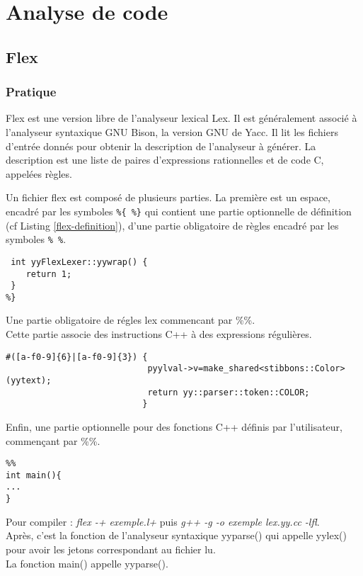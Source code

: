 \section{Analyse de code}

\subsection{Flex}

\subsubsection{Pratique}
Flex est une version libre de l'analyseur lexical Lex. Il est généralement associé à l'analyseur syntaxique GNU Bison, la version GNU de Yacc.
Il lit les fichiers d'entrée donnés pour obtenir la description de l'analyseur à générer. La description est une liste de paires d'expressions rationnelles et de code C, appelées règles. 

Un fichier flex est composé de plusieurs parties. La première est un espace, encadré par les symboles \verb|%{ %}| qui contient une partie optionnelle de définition (cf Listing \ref{flex-definition}), d'une partie obligatoire de règles encadré par les symboles \verb|% %|.

\begin{lstlisting}[caption=Partie définition d'un fichier flex,label=flex-definition]
%{
 int yyFlexLexer::yywrap() {
	return 1;
 }
%}
\end{lstlisting}
Une partie obligatoire de régles lex commencant par \%\%.\\
Cette partie associe des instructions C++ à des expressions régulières.
\begin{lstlisting}[label=flex-regles,caption=Partie règles de flex]
%%
#([a-f0-9]{6}|[a-f0-9]{3}) {
							pyylval->v=make_shared<stibbons::Color>(yytext); 
							return yy::parser::token::COLOR;
						   }
\end{lstlisting}
Enfin, une partie optionnelle pour des fonctions C++ définis par l'utilisateur, commençant par \%\%.\\
\begin{verbatim}
%%
int main(){
...
}
\end{verbatim}
Pour compiler : \textit{flex -+ exemple.l+}  puis \textit{g++ -g -o exemple lex.yy.cc -lfl}.\\
Après, c'est la fonction de l'analyseur syntaxique yyparse() qui appelle yylex() pour avoir les jetons correspondant au fichier lu.\\
La fonction main() appelle yyparse().\\

